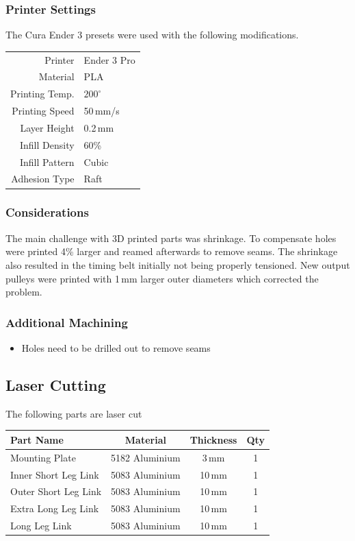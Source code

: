 \documentclass[11pt, titlepage]{article}
\begin{document}
\subsubsection{Printer Settings}
The Cura Ender 3 presets were used with the following modifications.

\begin{table}[h]
\centering
	\begin{tabular}{r l}
	\hline
		Printer & Ender 3 Pro\\
		Material & PLA \\
		Printing Temp. & $200^{\circ}$ \\
		Printing Speed & 50\,mm/s \\
		Layer Height & 0.2\,mm \\
		Infill Density & 60\% \\
		Infill Pattern & Cubic \\
		Adhesion Type & Raft \\
		\hline
	\end{tabular}
\end{table}

\subsubsection{Considerations}
The main challenge with 3D printed parts was shrinkage. To compensate holes were printed 4\% larger and reamed afterwards to remove seams. The shrinkage also resulted in the timing belt initially not being properly tensioned. New output pulleys were printed with 1\,mm larger outer diameters which corrected the problem.

\subsubsection{Additional Machining}
\begin{itemize}
	\item Holes need to be drilled out to remove seams
\end{itemize}


\newpage
\subsection{Laser Cutting}
The following parts are laser cut

\begin{table}[h]
\centering
\begin{tabular}{ l c c c}
	\textbf{Part Name} & \textbf{Material} & \textbf{Thickness} & \textbf{Qty} \\\hline
	Mounting Plate & 5182 Aluminium & 3\,mm & 1 \\
	Inner Short Leg Link & 5083 Aluminium & 10\,mm & 1\\
	Outer Short Leg Link & 5083 Aluminium & 10\,mm & 1 \\
	Extra Long Leg Link & 5083 Aluminium & 10\,mm & 1 \\
	Long Leg Link & 5083 Aluminium & 10\,mm & 1 \\
	\hline
\end{tabular}	
\end{table}
\end{document}
